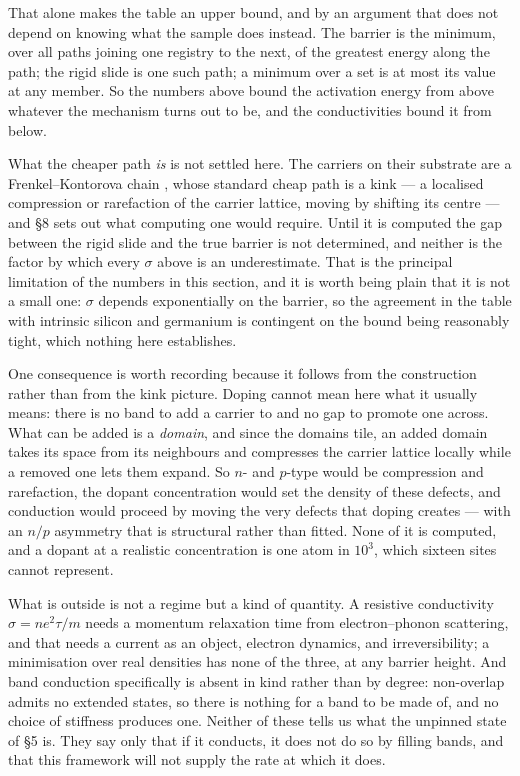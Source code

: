 \documentclass[11pt]{article}
\begin{document}
That alone makes the table an upper bound, and by an argument that does not depend on knowing what
the sample does instead. The barrier is the minimum, over all paths joining one registry to the
next, of the greatest energy along the path; the rigid slide is one such path; a minimum over a set
is at most its value at any member. So the numbers above bound the activation energy from above
whatever the mechanism turns out to be, and the conductivities bound it from below.

What the cheaper path \emph{is} is not settled here. The carriers on their substrate are a
Frenkel--Kontorova chain \cite{braun}, whose standard cheap path is a kink --- a localised
compression or rarefaction of the carrier lattice, moving by shifting its centre --- and \S8 sets
out what computing one would require. Until it is computed the gap between the rigid slide and the
true barrier is not determined, and neither is the factor by which every $\sigma$ above is an
underestimate. That is the principal limitation of the numbers in this section, and it is worth
being plain that it is not a small one: $\sigma$ depends exponentially on the barrier, so the
agreement in the table with intrinsic silicon and germanium is contingent on the bound being
reasonably tight, which nothing here establishes.

One consequence is worth recording because it follows from the construction rather than from the
kink picture. Doping cannot mean here what it usually means: there is no band to add a carrier to
and no gap to promote one across. What can be added is a \emph{domain}, and since the domains tile,
an added domain takes its space from its neighbours and compresses the carrier lattice locally while
a removed one lets them expand. So $n$- and $p$-type would be compression and rarefaction, the
dopant concentration would set the density of these defects, and conduction would proceed by moving
the very defects that doping creates --- with an $n/p$ asymmetry that is structural rather than
fitted. None of it is computed, and a dopant at a realistic concentration is one atom in $10^3$,
which sixteen sites cannot represent.

What is outside is not a regime but a kind of quantity. A resistive conductivity
$\sigma=ne^2\tau/m$ needs a momentum relaxation time from electron--phonon scattering, and that needs
a current as an object, electron dynamics, and irreversibility; a minimisation over real densities
has none of the three, at any barrier height. And band conduction specifically is absent in kind
rather than by degree: non-overlap admits no extended states, so there is nothing for a band to be
made of, and no choice of stiffness produces one. Neither of these tells us what the unpinned state
of \S5 is. They say only that if it conducts, it does not do so by filling bands, and that this
framework will not supply the rate at which it does.
\end{document}
